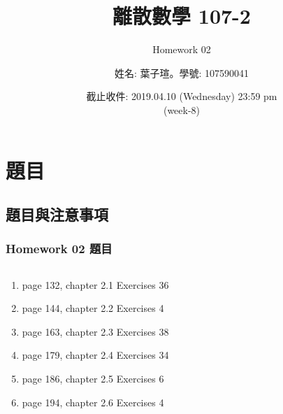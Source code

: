 \documentclass[14pt,hyperref={bookmarks=false}]{beamer}
\title{離散數學 107-2}
\subtitle{Homework 02}
\author{姓名: 葉子瑄。學號: 107590041}
\date{截止收件: 2019.04.10 (Wednesday) 23:59 pm \\ (week-8)}
\begin{document}

\begin{frame}
\titlepage
\end{frame}

\raggedright

\begin{frame}
\footnotesize
\tableofcontents
\end{frame}
	
\section{題目}

	\subsection{題目與注意事項}
	
	\begin{frame}
	\frametitle{Homework 02 題目}
	\fontsize{8pt}{9pt}\selectfont
	\setlength{\baselineskip}{5pt}
	\begin{columns}
	\begin{column}{0.68\textwidth}
	\begin{enumerate}[label=(Prob. \arabic*)]
	\setlength\itemsep{0em}
	\item page 132, chapter 2.1 Exercises 36
	\item page 144, chapter 2.2 Exercises 4
	\item page 163, chapter 2.3 Exercises 38
	\item page 179, chapter 2.4 Exercises 34
	\item page 186, chapter 2.5 Exercises 6
	\item page 194, chapter 2.6 Exercises 4
	\end{enumerate}
	\end{column}
	
	
	\end{columns}
	\end{frame}
	
\end{document}
